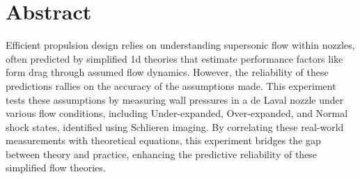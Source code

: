\thispagestyle{plain} %



\chapter*{Abstract} %

Efficient propulsion design relies on understanding supersonic flow within nozzles, often predicted by simplified \acrfull{1d} theories that estimate performance factors like form drag through assumed flow dynamics. However, the reliability of these predictions rallies on the accuracy of the assumptions made. This experiment tests these assumptions by measuring wall pressures in a de Laval nozzle under various flow conditions, including Under-expanded, Over-expanded, and Normal shock states, identified using Schlieren imaging. By correlating these real-world measurements with theoretical equations, this experiment bridges the gap between theory and practice, enhancing the predictive reliability of these simplified flow theories. 



